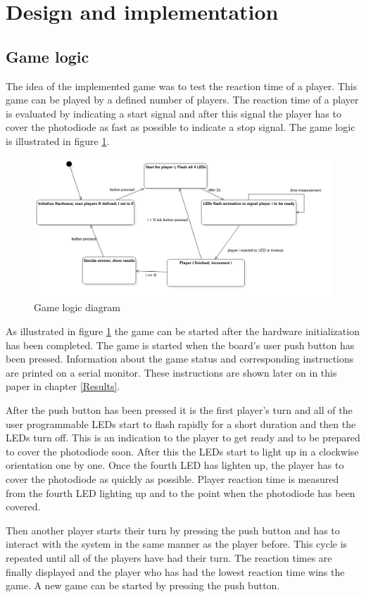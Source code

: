 \pagebreak


\section{Design and implementation}
\subsection{Game logic}
The idea of the implemented game was to test the reaction time of a player. This game can be played by a defined number of players. The reaction time of a player is evaluated by indicating a start signal and after this signal the player has to cover the photodiode as fast as possible to indicate a stop signal. The game logic is illustrated in figure \ref{fig:GameLogicDiagram}. 

\begin{figure}[htbp]
  \centering
     \includegraphics[width=1\textwidth]{./figures/FSM_Diagram.png}
  \caption{Game logic diagram}
  \label{fig:GameLogicDiagram}
\end{figure}

As illustrated in figure \ref{fig:GameLogicDiagram} the game can be started after the hardware initialization has been completed. The game is started when the board's user push button has been pressed. Information about the game status and corresponding instructions are printed on a serial monitor. These instructions are shown later on in this paper in chapter \ref{Results}.\\
\par
After the push button has been pressed it is the first player's turn and all of the user programmable LEDs start to flash rapidly for a short duration and then the LEDs turn off. This is an indication to the player to get ready and to be prepared to cover the photodiode soon. After this the LEDs start to light up in a clockwise orientation one by one. Once the fourth LED has lighten up, the player has to cover the photodiode as quickly as possible. Player reaction time is measured from the fourth LED lighting up and to the point when the photodiode has been covered.\\ 
\par
Then another player starts their turn by pressing the push button and has to interact with the system in the same manner as the player before. This cycle is repeated until all of the players have had their turn. The reaction times are finally displayed and the player who has had the lowest reaction time wins the game. A new game can be started by pressing the push button.

